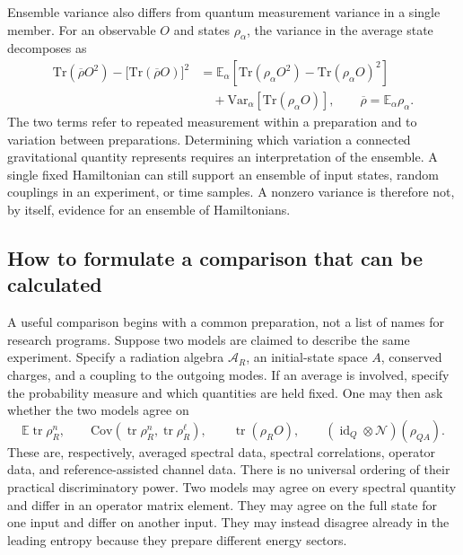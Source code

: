 \documentclass[11pt,letterpaper]{article}
\theoremstyle{plain}
\theoremstyle{definition}
\theoremstyle{remark}
\newcommand{\E}{\mathbb{E}}
\newcommand{\Var}{\text{Var}}
\newcommand{\Cov}{\text{Cov}}
\DeclareMathOperator{\tr}{tr}
\begin{document}
Ensemble variance also differs from quantum measurement variance in a
single member. For an observable $O$ and states $\rho_\alpha$, the
variance in the average state decomposes as
\begin{align}
 \mathrm{Tr}(\overline\rho O^2)
 -\bigl[\mathrm{Tr}(\overline\rho O)\bigr]^2
 &=\E_\alpha\left[\mathrm{Tr}(\rho_\alpha O^2)
       -\mathrm{Tr}(\rho_\alpha O)^2\right]
 \nonumber\\
 &\quad+\Var_\alpha\left[\mathrm{Tr}(\rho_\alpha O)\right],
 \qquad \overline\rho=\E_\alpha\rho_\alpha.
 \label{eq13:variance_decomposition}
\end{align}
The two terms refer to repeated measurement within a preparation and
to variation between preparations. Determining which variation a
connected gravitational quantity represents requires an interpretation
of the ensemble. A single fixed Hamiltonian can still support an
ensemble of input states, random couplings in an experiment, or time
samples. A nonzero variance is therefore not, by itself, evidence for
an ensemble of Hamiltonians.


\subsection{How to formulate a comparison that can be calculated}
\label{subsec13:observable_ranking}

A useful comparison begins with a common preparation, not a list of
names for research programs. Suppose two models are claimed to describe
the same experiment. Specify a radiation algebra $\mathcal A_R$, an
initial-state space $A$, conserved charges, and a coupling to the
outgoing modes. If an average is involved, specify the probability
measure and which quantities are held fixed. One may then ask whether
the two models agree on
\begin{equation}
 \E\tr\rho_R^n,\qquad
 \Cov(\tr\rho_R^n,\tr\rho_R^\ell),\qquad
 \tr(\rho_R O),\qquad
 (\operatorname{id}_Q\otimes\mathcal N)(\rho_{QA}).
 \label{eq13:comparison_observables}
\end{equation}
These are, respectively, averaged spectral data, spectral correlations,
operator data, and reference-assisted channel data. There is no
universal ordering of their practical discriminatory power. Two models
may agree on every spectral quantity and differ in an operator matrix
element. They may agree on the full state for one input and differ on
another input. They may instead disagree already in the leading
entropy because they prepare different energy sectors.
\end{document}
